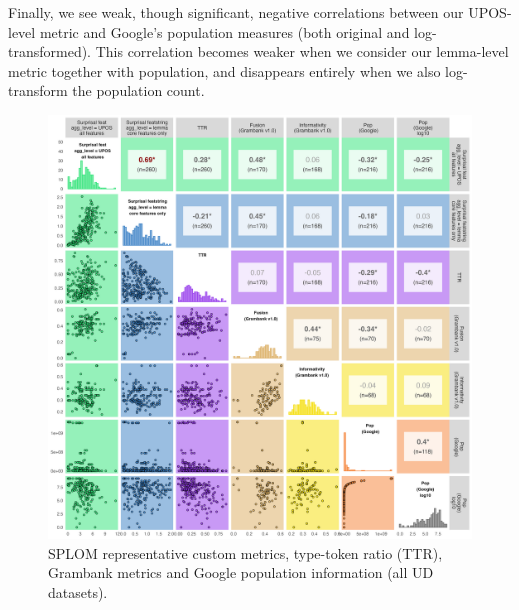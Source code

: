 \documentclass[USenglish]{article}
\begin{document}
Finally, we see weak, though significant, negative correlations between our UPOS-level metric and Google's population measures (both original and log-transformed).
This correlation becomes weaker when we consider our lemma-level metric together with population, and disappears entirely when we also log-transform the population count.

\begin{figure}
    \centering
        \includegraphics[width=1\linewidth]{latex/graphics/SPLOM_metrics_external.png}
    \caption{SPLOM representative custom metrics, type-token ratio (TTR), Grambank metrics and Google population information  (all UD datasets).}
    \label{fig:SPLOM_metrics_external}
\end{figure}
\end{document}
